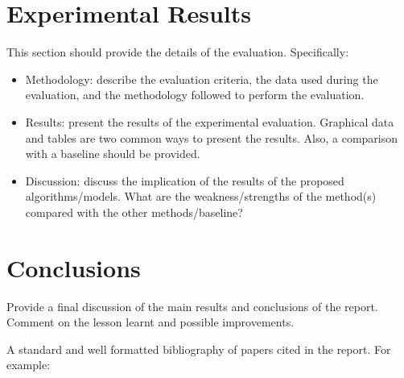 \documentclass{svproc}
\begin{document}
\section{Experimental Results}
	This section should provide the details of the evaluation. Specifically:
\begin{itemize}
	\item Methodology: describe the evaluation criteria, the data used during the evaluation, and the methodology followed to perform the evaluation.
	\item Results: present the results of the experimental evaluation. Graphical data and tables are two common ways to present the results. Also, a comparison with a baseline should be provided.
	\item Discussion: discuss the implication of the results of the proposed algorithms/models. What are the weakness/strengths of the method(s) compared with the other methods/baseline?
\end{itemize}


\section{Conclusions}
Provide a final discussion of the main results and conclusions of the report. Comment on the lesson learnt and possible improvements.

A standard and well formatted bibliography of papers cited in the report. For example:
\end{document}
